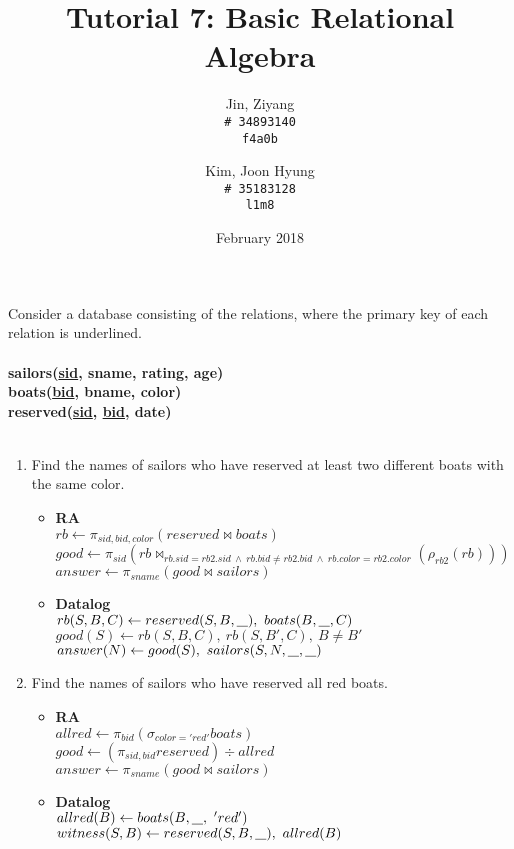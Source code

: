 \documentclass{article}
\title{Tutorial 7: Basic Relational Algebra}
\author{
	Jin, Ziyang\\
	\texttt{\# 34893140}\\
	\texttt{f4a0b}
	\and
	Kim, Joon Hyung\\
	\texttt{\# 35183128}\\
	\texttt{l1m8}
}
\date{February 2018}
\newcommand{\anyvar}{\underline{\hspace{0.8em}}}
\newcommand{\RA}{\textbf{RA}}
\newcommand{\DL}{\textbf{Datalog}}
\begin{document}
	\maketitle

\noindent Consider a database consisting of the relations, where the primary key of each relation is
underlined.\\
\\
\textbf{sailors(\underline{sid}, sname, rating, age)}\\
\textbf{boats(\underline{bid}, bname, color)}\\
\textbf{reserved(\underline{sid}, \underline{bid}, date)}\\
\\
\begin{enumerate}
\item Find the names of sailors who have reserved at least two different boats with the same color.
	\begin{itemize}
	\item \RA\\
	$rb \gets \pi_{sid, bid, color} (reserved \bowtie boats) $\\
	$good \gets \pi_{sid} (rb \bowtie_{rb.sid = rb2.sid\ \land \ rb.bid \neq rb2.bid\ \land \ rb.color = rb2.color} (\rho_{rb2}(rb)) )$\\
	$answer \gets \pi_{sname} (good \bowtie sailors)$
	\item \DL \\
	$ rb(S, B, C) \gets reserved(S, B, \anyvar ),\ boats(B, \anyvar , C) $\\
	$ good(S) \gets rb(S, B, C),\ rb(S, B', C),\ B \neq B' $\\
	$ answer(N) \gets good(S),\ sailors(S, N, \anyvar, \anyvar)$
	\end{itemize}
\item Find the names of sailors who have reserved all red boats.
	\begin{itemize}
	\item \RA \\
	$ allred \gets \pi_{bid} (\sigma_{color = 'red'} boats)$ \\
	$ good \gets (\pi_{sid, bid} reserved) \div allred $\\
	$ answer \gets \pi_{sname}(good \bowtie sailors)$
	\item \DL \\
	$ allred(B) \gets boats(B, \anyvar,\  'red') $\\
	$ witness(S, B) \gets reserved(S, B, \anyvar),\ allred(B) $ \\

\end{itemize}
\end{enumerate}
\end{document}
